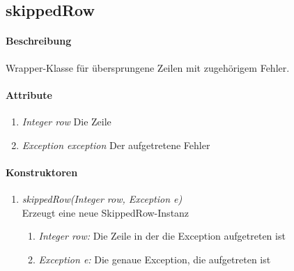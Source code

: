 \subsection{skippedRow}

\paragraph{Beschreibung}
Wrapper-Klasse für übersprungene Zeilen mit zugehörigem Fehler.


\paragraph{Attribute}

\begin{enumerate}[$\bullet$]
	\item \textit{Integer row} Die Zeile
	\item \textit{Exception exception} Der aufgetretene Fehler
\end{enumerate}



\paragraph{Konstruktoren}
\begin{enumerate}[+]
	\item \textit{skippedRow(Integer row, Exception e)} \\
	Erzeugt eine neue SkippedRow-Instanz
	\begin{enumerate}[$\bullet$]
		\item \textit{Integer row:} Die Zeile in der die Exception aufgetreten ist
		\item \textit{Exception e:} Die genaue Exception, die aufgetreten ist
	\end{enumerate}	
\end{enumerate}


